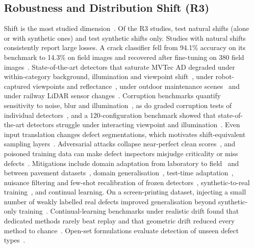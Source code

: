 \documentclass[journal]{IEEEtran}
\begin{document}
\subsection{Robustness and Distribution Shift (R3)}
Shift is the most studied dimension~\citeThree. Of the R3 studies, \nThreeNatural{} test natural shifts (alone or with synthetic ones) and \nThreeSynthetic{} test synthetic shifts only. Studies with natural shifts consistently report large losses. A crack classifier fell from 94.1\% accuracy on its benchmark to 14.3\% on field images and recovered after fine-tuning on 380 field images~\cite{ndjoko2026automated}. State-of-the-art detectors that saturate MVTec AD degraded under within-category background, illumination and viewpoint shift~\cite{zhang2023industrial,cao2023anomaly}, under robot-captured viewpoints and reflectance~\cite{chang2024rad}, under outdoor maintenance scenes~\cite{bao2023miad} and under railway LiDAR sensor changes~\cite{ghasemlou2026cross}. Corruption benchmarks quantify sensitivity to noise, blur and illumination~\cite{wang2024robustness,cheng2024rad}, as do graded corruption tests of individual detectors~\cite{agyemang2024multi}, and a 120-configuration benchmark showed that state-of-the-art detectors struggle under interacting viewpoint and illumination~\cite{cao2026visual}. Even input translation changes defect segmentations, which motivates shift-equivalent sampling layers~\cite{qu2023investigating}. Adversarial attacks collapse near-perfect clean scores~\cite{lo2022adversarially,mirzaei2024killing,nafez2025patchguard}, and poisoned training data can make defect inspectors misjudge criticality or miss defects~\cite{johansson2026poisoning}. Mitigations include domain adaptation from laboratory to field~\cite{wang2025efficient,ghoshmondal2025class,oliveirasantos2022domain} and between pavement datasets~\cite{liu2022deep}, domain generalisation~\cite{trinh2024multiple,chen2022domain}, test-time adaptation~\cite{song2024source,zia2026learning,lei2025adapted}, nuisance filtering and few-shot recalibration of frozen detectors~\cite{cao2026nfad,han2026sparc}, synthetic-to-real training~\cite{cordier2022improving,bondar2025synthetic,tabassum2024adapting,hasan2026xct,avramov2026synthetic,flotzinger2026synth}, and continual learning. On a screen-printing dataset, injecting a small number of weakly labelled real defects improved generalisation beyond synthetic-only training~\cite{krassnig2026isp}. Continual-learning benchmarks under realistic drift found that dedicated methods rarely beat replay and that geometric drift reduced every method to chance~\cite{weatherly2026rethinking}. Open-set formulations evaluate detection of unseen defect types~\cite{ding2022catching,wang2025distribution,yao2023explicit,liang2026open,alvarez2026foundation,frittoli2022deep,zhu2024anomaly,baitieva2024supervised}.
\end{document}
